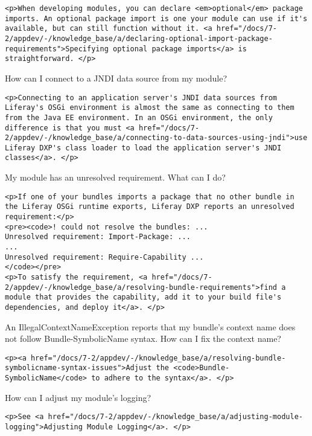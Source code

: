 \begin{verbatim}
<p>When developing modules, you can declare <em>optional</em> package imports. An optional package import is one your module can use if it's available, but can still function without it. <a href="/docs/7-2/appdev/-/knowledge_base/a/declaring-optional-import-package-requirements">Specifying optional package imports</a> is straightforward. </p>
\end{verbatim}

{How can I connect to a JNDI data source from my module?~{}}

\begin{verbatim}
<p>Connecting to an application server's JNDI data sources from Liferay's OSGi environment is almost the same as connecting to them from the Java EE environment. In an OSGi environment, the only difference is that you must <a href="/docs/7-2/appdev/-/knowledge_base/a/connecting-to-data-sources-using-jndi">use Liferay DXP's class loader to load the application server's JNDI classes</a>. </p>
\end{verbatim}

{My module has an unresolved requirement. What can I do?~{}}

\begin{verbatim}
<p>If one of your bundles imports a package that no other bundle in the Liferay OSGi runtime exports, Liferay DXP reports an unresolved requirement:</p>
<pre><code>! could not resolve the bundles: ...
Unresolved requirement: Import-Package: ...
...
Unresolved requirement: Require-Capability ...
</code></pre>
<p>To satisfy the requirement, <a href="/docs/7-2/appdev/-/knowledge_base/a/resolving-bundle-requirements">find a module that provides the capability, add it to your build file's dependencies, and deploy it</a>. </p>
\end{verbatim}

{An IllegalContextNameException reports that my bundle's context name
does not follow Bundle-SymbolicName syntax. How can I fix the context
name?~{}}

\begin{verbatim}
<p><a href="/docs/7-2/appdev/-/knowledge_base/a/resolving-bundle-symbolicname-syntax-issues">Adjust the <code>Bundle-SymbolicName</code> to adhere to the syntax</a>. </p>
\end{verbatim}

{How can I adjust my module's logging?~{}}

\begin{verbatim}
<p>See <a href="/docs/7-2/appdev/-/knowledge_base/a/adjusting-module-logging">Adjusting Module Logging</a>. </p>
\end{verbatim}

